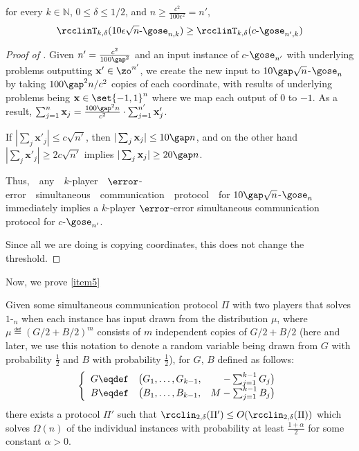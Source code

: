 \begin{lemma}
for every $k \in \mathbb{N}$, $0 \le \delta \le 1/2$, and $n \ge \frac{c^2}{100\epsilon^2}=n'$,
$$\rcclinT_{k,\delta}(10\epsilon\sqrt{n}\text{-}\gose_{n,k}) \ge \rcclinT_{k,\delta}(c\text{-}\gose_{n',k})$$
\label{lemma:gap-ort reduction}
\end{lemma}

\begin{proof}[Proof of ]
	Given $n'=\frac{c^2}{100\gap^2}$ and 
	an input instance of $c$-$\gose_{n'}$ with underlying \sumequal problems outputting $\mathbf{x}'\in \zo^{n'}$, we create the new input to $10\gap\sqrt{n}$-$\gose_n$ by taking $100\gap^2 n / c^2$ copies of each coordinate, 
	with results of underlying problems being $\mathbf{x}\in\set{-1, 1}^n$ {\color{black}where we map each output of $0$ to $-1$. }
	As a result, $\sum_{j=1}^{n}\mathbf{x}_j  =  \frac{100\gap^2 n}{c^2}\cdot \sum_{j=1}^{n'}\mathbf{x}'_j$.

	If $|\sum_{j}\mathbf{x}'_j| \le c\sqrt{n'}$,
	then $|\sum_{j}\mathbf{x}_j| \le 10\gap n$,
	and on the other hand 
	$|\sum_{j}\mathbf{x}'_j| \ge 2c\sqrt{n'}$
	implies $|\sum_{j}\mathbf{x}_j| \ge 20\gap n$.

%
%
Thus,\ \ any\ \ $k$-player\ \ $\error$-error\ \ simultaneous\ \ 
communication\ \ protocol\ \ for\quad    %
$10\gap\sqrt{n}$-$\gose_n$ immediately implies a $k$-player $\error$-error simultaneous communication protocol for $c$-$\gose_{n'}$.
	 
Since all we are doing is copying coordinates, this does not change the threshold.
\end{proof}

{\color{black} Now, we prove \ref{item5}}  %

\begin{theorem}
Given some simultaneous communication protocol $\Pi$ with two players that solves $1$-\gose$_n$ when each \sumequal instance has input drawn from the distribution $\mu$, {\color{black}where $\mu \eqdef \left(G/2+B/2\right)^m$ consists of $m$ independent copies of $G/2+B/2$ (here and later, we use this notation to denote a random variable being drawn from $G$ with probability $\frac{1}{2}$ and $B$ with probability $\frac{1}{2}$),
	for $G$, $B$ defined as follows:
	$$
		\left\{
		\begin{array}{c c r}
			G \eqdef &	\big( G_1,\dots, G_{k-1} , &-\sum_{j=1}^{k-1} G_j \big)		\\
			B \eqdef &  \big( B_1,\dots, B_{k-1} , &M-\sum_{j=1}^{k-1} B_j \big)
		\end{array}		
		\right.
	$$
}
	there exists a protocol $\Pi'$ such that $\rcclin_{2,\delta}(\Pi') \le O(\rcclin_{2,\delta}(\Pi))$ which solves $\Omega(n)$ of the individual \sumequal instances with probability at least{ \color{black}$\frac{1+\alpha}{2}$ for some constant $\alpha>0$.}
\label{thm:gose complexity}
\end{theorem}

